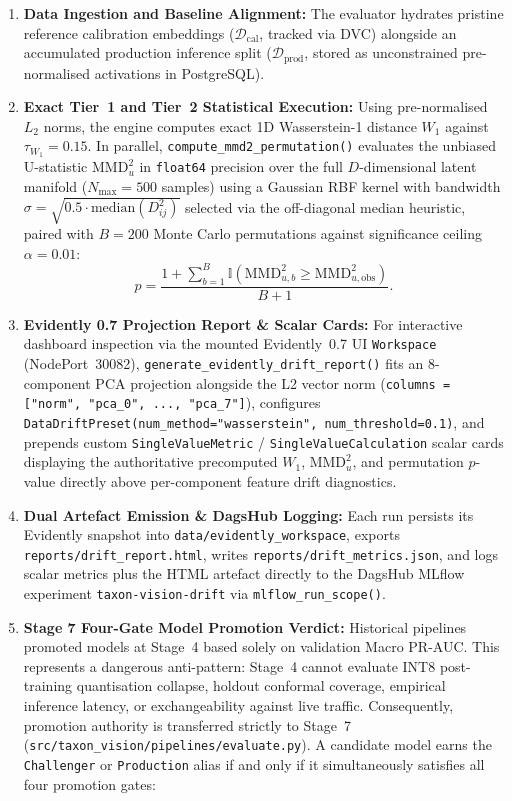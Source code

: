 \begin{enumerate}
    \item \textbf{Data Ingestion and Baseline Alignment:} The evaluator hydrates pristine reference calibration embeddings ($\mathcal{D}_{\text{cal}}$, tracked via DVC) alongside an accumulated production inference split ($\mathcal{D}_{\text{prod}}$, stored as unconstrained pre-normalised activations in PostgreSQL).
    \item \textbf{Exact Tier~1 and Tier~2 Statistical Execution:} Using pre-normalised $L_2$ norms, the engine computes exact 1D Wasserstein-1 distance $W_1$ against $\tau_{W_1} = 0.15$. In parallel, \nolinkurl{compute_mmd2_permutation()} evaluates the unbiased U-statistic $\text{MMD}_u^2$ in \texttt{float64} precision over the full $D$-dimensional latent manifold ($N_{\max} = 500$ samples) using a Gaussian RBF kernel with bandwidth $\sigma = \sqrt{0.5 \cdot \text{median}(D_{ij}^2)}$ selected via the off-diagonal median heuristic, paired with $B = 200$ Monte Carlo permutations against significance ceiling $\alpha = 0.01$:
    \begin{equation}
        p = \frac{1 + \sum_{b=1}^B \mathbb{I}\left(\text{MMD}^2_{u,b} \ge \text{MMD}^2_{u,\text{obs}}\right)}{B + 1}.
    \end{equation}
    \item \textbf{Evidently 0.7 Projection Report \& Scalar Cards:} For interactive dashboard inspection via the mounted Evidently~0.7 UI \texttt{Workspace} (NodePort~30082), \nolinkurl{generate_evidently_drift_report()} fits an 8-component PCA projection alongside the L2 vector norm (\nolinkurl{columns = ["norm", "pca_0", ..., "pca_7"]}), configures \texttt{DataDriftPreset(num\_method="wasserstein", num\_threshold=0.1)}, and prepends custom \texttt{SingleValueMetric} / \texttt{SingleValueCalculation} scalar cards displaying the authoritative precomputed $W_1$, $\text{MMD}_u^2$, and permutation $p$-value directly above per-component feature drift diagnostics.
    \item \textbf{Dual Artefact Emission \& DagsHub Logging:} Each run persists its Evidently snapshot into \nolinkurl{data/evidently_workspace}, exports \nolinkurl{reports/drift_report.html}, writes \nolinkurl{reports/drift_metrics.json}, and logs scalar metrics plus the HTML artefact directly to the DagsHub MLflow experiment \texttt{taxon-vision-drift} via \nolinkurl{mlflow_run_scope()}.
    \item \textbf{Stage 7 Four-Gate Model Promotion Verdict:} Historical pipelines promoted models at Stage~4 based solely on validation Macro PR-AUC. This represents a dangerous anti-pattern: Stage~4 cannot evaluate INT8 post-training quantisation collapse, holdout conformal coverage, empirical inference latency, or exchangeability against live traffic. Consequently, promotion authority is transferred strictly to Stage~7 (\texttt{src/taxon\_vision/pipelines/evaluate.py}). A candidate model earns the \texttt{Challenger} or \texttt{Production} alias if and only if it simultaneously satisfies all four promotion gates:

\end{enumerate}
